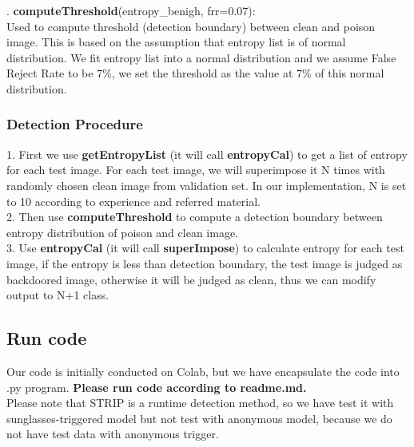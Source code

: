 \documentclass[12pt]{article}
\begin{document}
	. \textbf{computeThreshold}(entropy\_benigh, frr=0.07):\\
	\indent Used to compute threshold (detection boundary) between clean and poison image. This is based on the assumption that entropy list is of normal distribution. We fit entropy list into a normal distribution and we assume False Reject Rate to be 7\%, we set the threshold as the value at 7\% of this normal distribution.\\
	
	\subsubsection{Detection Procedure}
	1. First we use \textbf{getEntropyList} (it will call \textbf{entropyCal}) to get a list of entropy for each test image. For each test image, we will superimpose it N times with randomly chosen clean image from validation set. In our implementation, N is set to 10 according to experience and referred material.\\
	2. Then use \textbf{computeThreshold} to compute a detection boundary between entropy distribution of poison and clean image. \\
	3. Use \textbf{entropyCal} (it will call \textbf{superImpose}) to calculate entropy for each test image, if the entropy is less than detection boundary, the test image is judged as backdoored image, otherwise it will be judged as clean, thus we can modify output to N+1 class. 
	
	\subsection{Run code}
	Our code is initially conducted on Colab, but we have encapsulate the code into .py program.
	\textbf{Please run code according to readme.md.}\\
	
	\noindent *Please note that STRIP is a runtime detection method, so we have test it with sunglasses-triggered model but not test with anonymous model, because we do not have test data with anonymous trigger.
	
	
\end{document}
